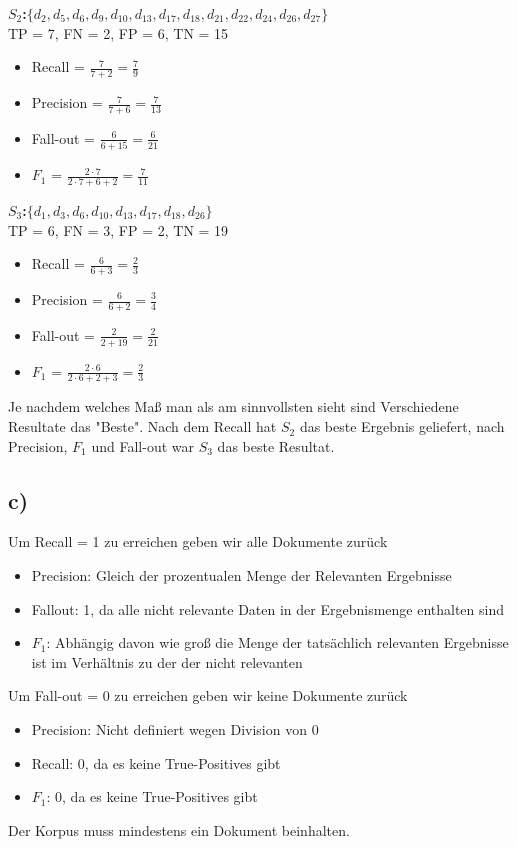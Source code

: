 \documentclass[11pt,a4paper,parskip=half ]{scrartcl}
\begin{document}
	
	\textbf{$S_{2}$:}$\{d_{2},d_{5},d_{6},d_{9},d_{10},d_{13},d_{17},d_{18},d_{21},d_{22},d_{24},d_{26},d_{27}\}$
	\\ 
	TP = 7, FN = 2, FP = 6, TN = 15
	\begin{itemize}
		\item Recall = $\frac{7}{7+2} = \frac{7}{9}$
		\item Precision = $\frac{7}{7+6} = \frac{7}{13}$
		\item Fall-out = $\frac{6}{6+15} = \frac{6}{21}$
		\item $F_{1}$ = $\frac{2\cdot7}{2\cdot7+6+2} = \frac{7}{11}$
	\end{itemize}
	
	\textbf{$S_{3}$:}$\{d_{1},d_{3},d_{6},d_{10},d_{13},d_{17},d_{18},d_{26}\}$	\\
	TP = 6, FN = 3, FP = 2, TN = 19
	\begin{itemize}
		\item Recall = $\frac{6}{6+3} = \frac{2}{3}$
		\item Precision = $\frac{6}{6+2} = \frac{3}{4}$
		\item Fall-out = $\frac{2}{2+19} = \frac{2}{21}$
		\item $F_{1}$ = $\frac{2\cdot6}{2\cdot6+2+3} = \frac{2}{3}$
	\end{itemize}
	
	Je nachdem welches Maß man als am sinnvollsten sieht sind Verschiedene Resultate das "Beste". Nach dem Recall hat $S_{2}$ das beste Ergebnis geliefert, nach Precision, $F_{1}$ und Fall-out war $S_{3}$ das beste Resultat.
	\subsection*{c)}
	Um Recall = 1 zu erreichen geben wir alle Dokumente zurück
	\begin{itemize}
		\item Precision: Gleich der prozentualen Menge der Relevanten Ergebnisse
		\item Fallout: 1, da alle nicht relevante Daten in der Ergebnismenge enthalten sind
		\item $F_{1}$: Abhängig davon wie groß die Menge der tatsächlich relevanten Ergebnisse ist im Verhältnis zu der der nicht relevanten
	\end{itemize}
	
	Um Fall-out = 0 zu erreichen geben wir keine Dokumente zurück
	\begin{itemize}
		\item Precision: Nicht definiert wegen Division von 0
		\item Recall: 0, da es keine True-Positives gibt
		\item $F_{1}$: 0, da es keine True-Positives gibt
	\end{itemize}
	
	Der Korpus muss mindestens ein Dokument beinhalten.
	
	
\end{document}
